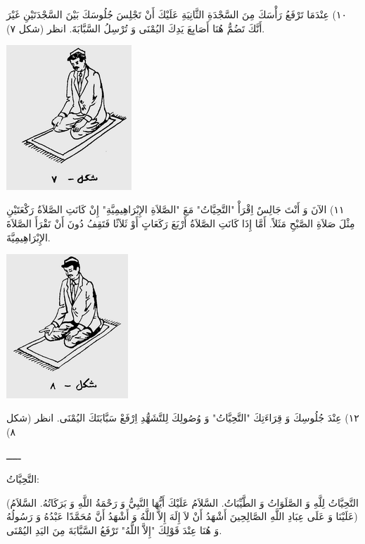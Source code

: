 \documentclass[a5paper]{article}
\begin{document}
١٠) عِنْدَمَا تَرْفَعُ رَأْسَكَ مِنَ السَّجْدَةِ الثَّانِيَةِ عَلَيْكَ أَنْ تَجْلِسَ جُلُوسَكَ بَيْنَ السَّجْدَتَيْنِ غَيْرَ أَنَّكَ تَضُمُّ هُنَا أَصَابِعَ يَدِكَ اليُمْنَى وَ تُرْسِلُ السَّبَّابَةَ. انظر (شكل ٧).

\begin{center}
\includegraphics[width=1.8583in,height=2.1417in]{images/MuhammadBagauddinprettified-img349.png}
\end{center}
١١) الآنَ وَ أَنْتَ جَالِسٌ اِقْرَأْ "التَّحِيَّاتُ" مَعَ "الصَّلاَةِ الإِبْرَاهِيمِيَّةِ" إِنْ كَانَتِ الصَّلاَةُ رَكْعَتَيْنِ مِثْلَ صَلاَةِ الصَّبْحِ مَثَلاً. أَمَّا إِذَا كَانَتِ الصَّلاَةُ أَرْبَعَ رَكَعَاتٍ أَوْ ثَلاَثًا فَتَقِفُ دُونَ أَنْ تَقْرَأَ الصَّلاَةَ الإِبْرَاهِيمِيَّةَ. 

\begin{center}
\includegraphics[width=1.802in,height=2.1319in]{images/MuhammadBagauddinprettified-img350.png}
\end{center}
١٢) عِنْدَ جُلُوسِكَ وَ قِرَاءَتِكَ "التَّحِيَّاتُ" وَ وُصُولِكَ لِلتَّشَهُّدِ اِرْفَعْ سَبَّابَتَكَ اليُمْنَى. انظر (شكل ٨)

ـــــ

التَّحِيَّاتُ:

(التَّحِيَّاتُ لِلَّهِ وَ الصَّلَوَاتُ وَ الطَّيِّبَاتُ. السَّلاَمُ عَلَيْكَ أَيُّهَا النَّبِيُّ وَ رَحْمَةُ اللَّهِ وَ بَرَكَاتُهُ. السَّلاَمُ عَلَيْنَا وَ عَلَى عِبَادِ اللَّهِ الصَّالِحِينَ أَشْهَدُ أَنْ لاَ إِلَهَ إِلاَّ اللَّهُ وَ أَشْهَدُ أَنَّ مُحَمَّدًا عَبْدُهُ وَ رَسُولُهُ) وَ هُنَا عِنْدَ قَوْلِكَ "إِلاَّ اللَّهُ" تَرْفَعُ السَّبَّابَةَ مِنَ اليَدِ اليُمْنَى.
\end{document}
